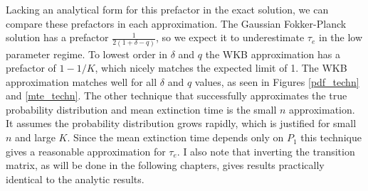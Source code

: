Lacking an analytical form for this prefactor in the exact solution, we can compare these prefactors in each approximation. 
The Gaussian Fokker-Planck solution has a prefactor $\frac{1}{2(1+\delta-q)}$, so we expect it to underestimate $\tau_e$ in the low parameter regime. %
To lowest order in $\delta$ and $q$ the WKB approximation has a prefactor of $1-1/K$, which nicely matches the expected limit of 1. 
The WKB approximation matches well for all $\delta$ and $q$ values, as seen in Figures \ref{pdf_techn} and \ref{mte_techn}. 
The other technique that successfully approximates the true probability distribution and mean extinction time is the small $n$ approximation. %
It assumes the probability distribution grows rapidly, which is justified for small $n$ and large $K$. 
Since the mean extinction time depends only on $P_1$ this technique gives a reasonable approximation for $\tau_e$. 
I also note that inverting the transition matrix, as will be done in the following chapters, gives results practically identical to the analytic results. 

